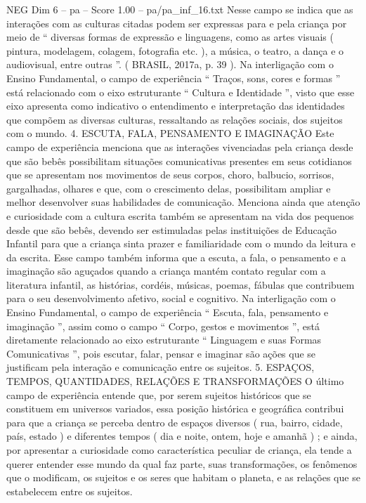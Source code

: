 \begin{textsample}{NEG Dim 6 – pa – Score 1.00 – pa/pa\_inf\_16.txt}
Nesse campo se indica que as interações com as culturas citadas podem ser expressas para e pela criança por meio de “ diversas formas de expressão e linguagens, como as artes visuais ( pintura, modelagem, colagem, fotografia etc. ), a música, o teatro, a dança e o audiovisual, entre outras ”. ( BRASIL, 2017a, p. 39 ).
Na interligação com o Ensino Fundamental, o campo de experiência “ Traços, sons, cores e formas ” está relacionado com o eixo estruturante “ Cultura e Identidade ”, visto que esse eixo apresenta como indicativo o entendimento e interpretação das identidades que compõem as diversas culturas, ressaltando as relações sociais, dos sujeitos com o mundo. 4.
ESCUTA, FALA, PENSAMENTO E IMAGINAÇÃO Este campo de experiência menciona que as interações vivenciadas pela criança desde que são bebês possibilitam situações comunicativas presentes em seus cotidianos que se apresentam nos movimentos de seus corpos, choro, balbucio, sorrisos, gargalhadas, olhares e que, com o crescimento delas, possibilitam ampliar e melhor desenvolver suas habilidades de comunicação.
Menciona ainda que atenção e curiosidade com a cultura escrita também se apresentam na vida dos pequenos desde que são bebês, devendo ser estimuladas pelas instituições de Educação Infantil para que a criança sinta prazer e familiaridade com o mundo da leitura e da escrita.
Esse campo também informa que a escuta, a fala, o pensamento e a imaginação são aguçados quando a criança mantém contato regular com a literatura infantil, as histórias, cordéis, músicas, poemas, fábulas que contribuem para o seu desenvolvimento afetivo, social e cognitivo.
Na interligação com o Ensino Fundamental, o campo de experiência “ Escuta, fala, pensamento e imaginação ”, assim como o campo “ Corpo, gestos e movimentos ”, está diretamente relacionado ao eixo estruturante “ Linguagem e suas Formas Comunicativas ”, pois escutar, falar, pensar e imaginar são ações que se justificam pela interação e comunicação entre os sujeitos. 5.
ESPAÇOS, TEMPOS, QUANTIDADES, RELAÇÕES E TRANSFORMAÇÕES O último campo de experiência entende que, por serem sujeitos históricos que se constituem em universos variados, essa posição histórica e geográfica contribui para que a criança se perceba dentro de espaços diversos ( rua, bairro, cidade, país, estado ) e diferentes tempos ( dia e noite, ontem, hoje e amanhã ) ; e ainda, por apresentar a curiosidade como característica peculiar de criança, ela tende a querer entender esse mundo da qual faz parte, suas transformações, os fenômenos que o modificam, os sujeitos e os seres que habitam o planeta, e as relações que se estabelecem entre os sujeitos.

\end{textsample}
